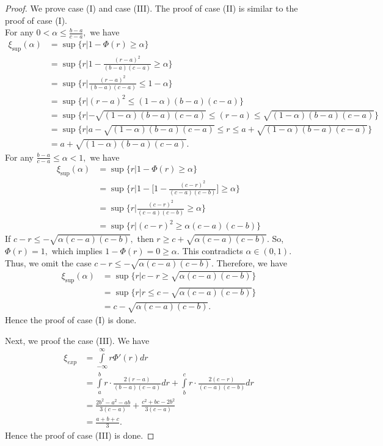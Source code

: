 \begin{proof}
	We prove case (I) and case (III). The proof of case (II) is similar to the proof of case (I).\\
	For any $0<\alpha\leq \frac{b-a}{c-a},$ we have
	\begin{equation*} 
	\begin{aligned}
	\xi_{\sup}(\alpha)&=\sup\{r|1-\Phi(r)\geq \alpha\}\\
&=\sup\bigg\{r\bigg|1-\frac{(r-a)^2}{(b-a)(c-a)}\geq \alpha\bigg\}\\
&=\sup\bigg\{r\bigg|\frac{(r-a)^2}{(b-a)(c-a)}\leq 1-\alpha\bigg\}\\
&=\sup\{r|(r-a)^2\leq (1-\alpha)(b-a)(c-a)\}\\
&=\sup\bigg\{r|-\sqrt{(1-\alpha)(b-a)(c-a)}\leq (r-a)\leq \sqrt{(1-\alpha)(b-a)(c-a)}\bigg\}\\
&=\sup\bigg\{r|a-\sqrt{(1-\alpha)(b-a)(c-a)}\leq r\leq a+\sqrt{(1-\alpha)(b-a)(c-a)}\bigg\}\\
&=a+\sqrt{(1-\alpha)(b-a)(c-a)}.
\end{aligned}
\end{equation*}
For any $\frac{b-a}{c-a}\leq\alpha<1,$ we have
\begin{equation*} 
	\begin{aligned}
		\xi_{\sup}(\alpha)&=\sup\{r|1-\Phi(r)\geq \alpha\}\\
		&=\sup\bigg\{r\bigg|1-\bigg[1-\frac{(c-r)^2}{(c-a)(c-b)}\bigg]\geq \alpha\bigg\}\\
		&=\sup\bigg\{r\bigg|\frac{(c-r)^2}{(c-a)(c-b)}\geq \alpha\bigg\}\\
		&=\sup\{r|(c-r)^2\geq \alpha (c-a)(c-b)\}
	\end{aligned}
\end{equation*}
If $c-r\leq -\sqrt{\alpha(c-a)(c-b)},$ then $r\geq c+\sqrt{\alpha(c-a)(c-b)}.$ So, $\Phi(r)=1,$ which implies $1-\Phi(r)=0\geq \alpha.$ This contradicts $\alpha \in (0,1).$
Thus, we omit the case $c-r\leq -\sqrt{\alpha(c-a)(c-b)}.$  Therefore, we have 
\begin{equation*}
	\begin{aligned}
		\xi_{\sup}(\alpha)&=\sup\bigg\{r| c-r\geq \sqrt{\alpha(c-a)(c-b)}\bigg\}\\
		&=\sup\bigg\{r|r\leq c-\sqrt{\alpha(c-a)(c-b)}\bigg\}\\
		&=c-\sqrt{\alpha(c-a)(c-b)}.
	\end{aligned}
\end{equation*}
Hence the proof of case (I) is done.
\par Next, we proof the case (III). We have 
\begin{equation*} 
	\begin{aligned}
		\xi_{exp}&=\int\limits_{-\infty}^{\infty}r{\Phi}'(r)dr\\
		&=\int\limits_{a}^{b}r\cdot \frac{2(r-a)}{(b-a)(c-a)}dr+\int\limits_{b}^{c}r\cdot \frac{2(c-r)}{(c-a)(c-b)}dr\\
		&=\frac{2b^2-a^2-ab}{3(c-a)}+\frac{c^2+bc-2b^2}{3(c-a)}\\
		&=\frac{a+b+c}{3}.
	\end{aligned}
\end{equation*}
Hence the proof of case (III) is done.
\end{proof}
